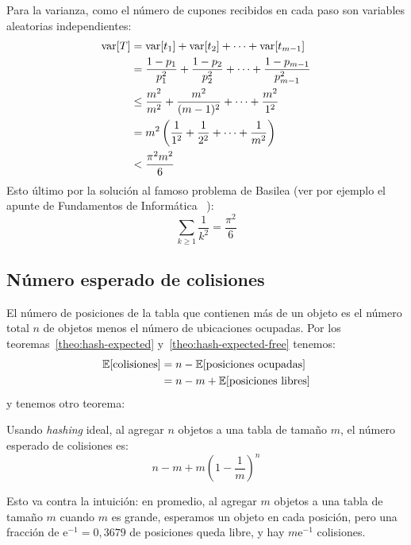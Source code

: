   Para la varianza,
  como el número de cupones recibidos en cada paso
  son variables aleatorias independientes:
  \begin{align*}
    \operatorname{var}[T]
      &=   \operatorname{var}[t_1] + \operatorname{var}[t_2] + \dotsb + \operatorname{var}[t_{m - 1}] \\
      &=   \frac{1 - p_1}{p_1^2}
             + \frac{1 - p_2}{p_2^2}
             + \dotsb
             + \frac{1 - p_{m - 1}}{p_{m - 1}^2} \\
      &\le \frac{m^2}{m^2}
             + \frac{m^2}{(m - 1)^2}
             + \dotsb
             + \frac{m^2}{1^2} \\
      &=   m^2 \left(
                 \frac{1}{1^2} + \frac{1}{2^2} + \dotsb + \frac{1}{m^2}
               \right) \\
      &<   \frac{\pi^2 m^2}{6}
  \end{align*}
  Esto último por la solución al famoso problema de Basilea
  (ver por ejemplo el apunte de Fundamentos de Informática~%
    \cite[capítulo~18]{brand17:_fundamentos_informatica}):
  \begin{equation*}
    \sum_{k \ge 1} \frac{1}{k^2}
      = \frac{\pi^2}{6}
  \end{equation*}

\subsection{Número esperado de colisiones}
\label{sec:numero-colisiones}

  El número de posiciones de la tabla que contienen más de un objeto
  es el número total \(n\) de objetos menos el número de ubicaciones ocupadas.
  Por los teoremas~\ref{theo:hash-expected} y~\ref{theo:hash-expected-free}
  tenemos:
  \begin{align*}
    \operatorname{\mathbb{E}}[ \text{colisiones} ]
      &= n - \operatorname{\mathbb{E}}[ \text{posiciones ocupadas} ] \\
      &= n - m + \operatorname{\mathbb{E}}[ \text{posiciones libres} ]
  \end{align*}
  y tenemos otro teorema:
  \begin{theorem}
    \label{theo:hash-expected-collisions}
    Usando \emph{\foreignlanguage{english}{hashing}} ideal,
    al agregar \(n\) objetos a una tabla de tamaño \(m\),
    el número esperado de colisiones es:
    \begin{equation*}
      n - m + m \left( 1 - \frac{1}{m} \right)^n
    \end{equation*}
  \end{theorem}
  Esto va contra la intuición:
  en promedio,
  al agregar \(m\) objetos a una tabla de tamaño \(m\) cuando \(m\) es grande,
  esperamos un objeto en cada posición,
  pero una fracción de \(\mathrm{e}^{-1} = 0,3679\) de posiciones queda libre,
  y hay \(m \mathrm{e}^{-1}\) colisiones.


